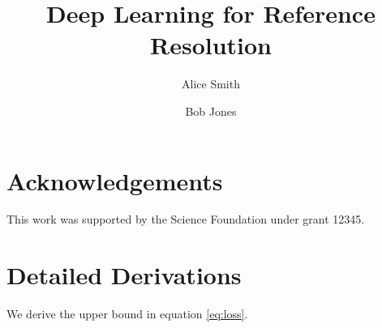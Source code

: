 \documentclass{article}
\begin{document}
\title{Deep Learning for Reference Resolution}
\author{Alice Smith \and Bob Jones}
\maketitle




\section*{Acknowledgements}
This work was supported by the Science Foundation under grant 12345.

\appendix
\section{Detailed Derivations}
We derive the upper bound in equation \eqref{eq:loss}.



\end{document}
